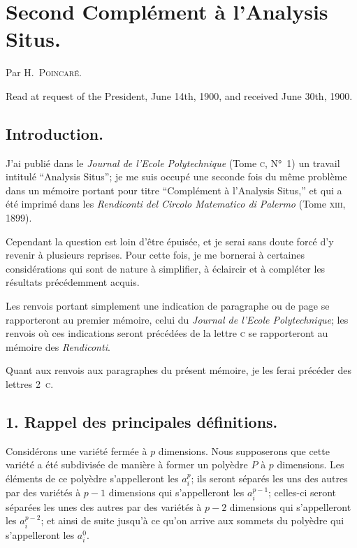 \documentclass{article}
\begin{document}

\section*{Second Complément à l'Analysis Situs.}

Par H.~\textsc{Poincaré}.

Read at request of the President, June 14th, 1900, and received June 30th, 1900.

\subsection*{Introduction.}

J'ai publié dans le \emph{Journal de l'Ecole Polytechnique} (Tome \textsc{c}, N°~1) un travail intitulé “Analysis Situs”; je me suis occupé une seconde fois du même problème dans un mémoire portant pour titre “Complément à l'Analysis Situs,” et qui a été imprimé dans les \emph{Rendiconti del Circolo Matematico di Palermo} (Tome \textsc{xiii}, 1899).

Cependant la question est loin d'être épuisée, et je serai sans doute forcé d'y revenir à plusieurs reprises. Pour cette fois, je me bornerai à certaines considérations qui sont de nature à simplifier, à éclaircir et à compléter les résultats précédemment acquis.

Les renvois portant simplement une indication de paragraphe ou de page se rapporteront au premier mémoire, celui du \emph{Journal de l'Ecole Polytechnique}; les renvois où ces indications seront précédées de la lettre \textsc{c} se rapporteront au mémoire des \emph{Rendiconti}.

Quant aux renvois aux paragraphes du présent mémoire, je les ferai précéder des lettres 2~\textsc{c}.

\subsection*{1. Rappel des principales définitions.}

Considérons une variété fermée à $p$ dimensions. Nous supposerons que cette variété a été subdivisée de manière à former un polyèdre $P$ à $p$ dimensions. Les éléments de ce polyèdre s'appelleront les $a^{p}_{i}$; ils seront séparés les uns des autres par des variétés à $p-1$ dimensions qui s'appelleront les $a^{p-1}_{i}$; celles-ci seront séparées les unes des autres par des variétés à $p-2$ dimensions qui s'appelleront les $a^{p-2}_{i}$; et ainsi de suite jusqu'à ce qu'on arrive aux sommets du polyèdre qui s'appelleront les $a^{0}_{i}$.
\end{document}
